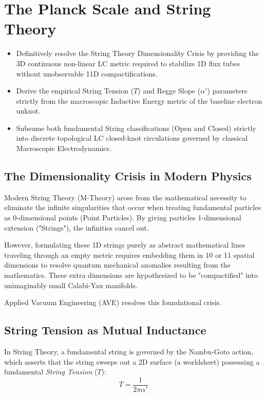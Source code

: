 \chapter{The Planck Scale and String Theory}
\label{ch:string_theory}

\begin{objectivebox}
\begin{itemize}
    \item Definitively resolve the String Theory Dimensionality Crisis by providing the 3D continuous non-linear LC metric required to stabilize 1D flux tubes without unobservable 11D compactifications.
    \item Derive the empirical String Tension ($T$) and Regge Slope ($\alpha'$) parameters strictly from the macroscopic Inductive Energy metric of the baseline electron unknot.
    \item Subsume both fundamental String classifications (Open and Closed) strictly into discrete topological LC closed-knot circulations governed by classical Macroscopic Electrodynamics.
\end{itemize}
\end{objectivebox}

\section{The Dimensionality Crisis in Modern Physics}
Modern String Theory (M-Theory) arose from the mathematical necessity to eliminate the infinite singularities that occur when treating fundamental particles as 0-dimensional points (Point Particles). By giving particles 1-dimensional extension ("Strings"), the infinities cancel out.

However, formulating these 1D strings purely as abstract mathematical lines traveling through an empty metric requires embedding them in 10 or 11 spatial dimensions to resolve quantum mechanical anomalies resulting from the mathematics. These extra dimensions are hypothesized to be "compactified" into unimaginably small Calabi-Yau manifolds. 

Applied Vacuum Engineering (AVE) resolves this foundational crisis.

\section{String Tension as Mutual Inductance}
In String Theory, a fundamental string is governed by the Nambu-Goto action, which asserts that the string sweeps out a 2D surface (a worldsheet) possessing a fundamental \textit{String Tension} ($T$):
\begin{equation}
    T = \frac{1}{2\pi\alpha'}
\end{equation}

